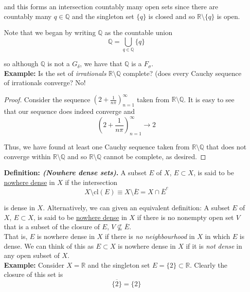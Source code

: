\documentclass[12pt]{article}
\newlength\tindent
\renewcommand{\indent}{\hspace*{\tindent}}
\newcommand{\R}{\mathbb R}
\newcommand{\Q}{\mathbb Q}
\newcommand{\cl}{\mathrm{cl}} %
\begin{document}
and this forms an intersection countably many open sets since there are countably many $q\in\Q$ and the singleton set $\{q\}$ is closed and so $\R\setminus\{q\}$ is open. 

Note that we began by writing $\Q$ as the countable union
\begin{equation*}
	\Q = \bigcup_{q\in\Q} \{q\}
\end{equation*}

so although $\Q$ is not a $G_\delta$, we have that $\Q$ is a $F_\sigma$. \\

%
%
{\bf Example:} Is the set of {\em irrationals} $\R\setminus\Q$ complete? (does every Cauchy sequence of irrationals converge? No!
	
\begin{proof} Consider the sequence $\left( 2 + \frac{1}{n\pi} \right)^\infty_{n = 1}$ taken from $\R\setminus\Q$. It is easy to see that our sequence does indeed converge and
\begin{equation*}
	\left( 2 + \frac{1}{n\pi} \right)^\infty_{n = 1} \longrightarrow 2
\end{equation*}
	
\indent Thus, we have found at least one Cauchy sequence taken from $\R\setminus\Q$ that does not converge within $\R\setminus\Q$ and so $\R\setminus\Q$ cannot be complete, as desired.
\end{proof}

%
% 
{\bf Definition: {\em (Nowhere dense sets)}.} A subset $E$ of $X$, $E \subset X$, is said to be \underline{nowhere dense} in $X$ if the intersection
\begin{equation*}
	X\setminus\cl(E) \equiv X\setminus\overline{E} = X\cap\overline{E}^c
\end{equation*}

is dense in $X$. Alternatively, we can given an equivalent definition: A subset $E$ of $X$, $E \subset X$, is said to be \underline{nowhere dense} in $X$ if there is no nonempty open set $V$ that is a subset of the closure of $E$, $V \nsubseteq \overline{E}$. \\

\indent That is, $E$ is nowhere dense in $X$ if there is {\em no neighbourhood} in $X$ in which $E$ is dense. We can think of this as $E \subset X$ is nowhere dense in $X$ if it is {\em not dense} in any open subset of $X$. \\

%
%
{\bf Example:} Consider $X = \R$ and the singleton set $E = \{2\} \subset \R$. Clearly the closure of this set is
\begin{equation*}
	\overline{\{2\}} = \{2\}
\end{equation*}
\end{document}
